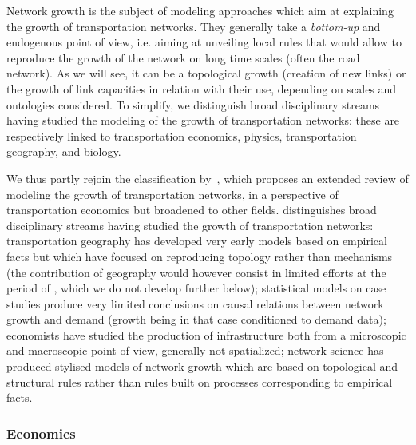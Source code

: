 \documentclass[10pt]{article}
\begin{document}
Network growth is the subject of modeling approaches which aim at explaining the growth of transportation networks. They generally take a \emph{bottom-up} and endogenous point of view, i.e. aiming at unveiling local rules that would allow to reproduce the growth of the network on long time scales (often the road network). As we will see, it can be a topological growth (creation of new links) or the growth of link capacities in relation with their use, depending on scales and ontologies considered. To simplify, we distinguish broad disciplinary streams having studied the modeling of the growth of transportation networks: these are respectively linked to transportation economics, physics, transportation geography, and biology.

We thus partly rejoin the classification by~\cite{xie2009modeling}, which proposes an extended review of modeling the growth of transportation networks, in a perspective of transportation economics but broadened to other fields. \cite{xie2009modeling} distinguishes broad disciplinary streams having studied the growth of transportation networks: transportation geography has developed very early models based on empirical facts but which have focused on reproducing topology rather than mechanisms (the contribution of geography would however consist in limited efforts at the period of \cite{haggett1970network}, which we do not develop further below); statistical models on case studies produce very limited conclusions on causal relations between network growth and demand (growth being in that case conditioned to demand data); economists have studied the production of infrastructure both from a microscopic and macroscopic point of view, generally not spatialized; network science has produced stylised models of network growth which are based on topological and structural rules rather than rules built on processes corresponding to empirical facts.

\subsubsection{Economics}
\end{document}
